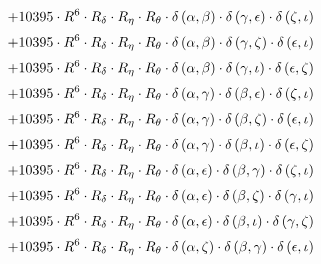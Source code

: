 \begin{subequations}
\begin{gather}
 \\[0.2em] \notag 		 + 10395 \cdot R^{6} \cdot R_{\delta{}} \cdot R_{\eta{}} \cdot R_{\theta{}} \cdot \delta{}\left(\alpha{}, \beta{}\right) \cdot \delta{}\left(\gamma{}, \epsilon{}\right) \cdot \delta{}\left(\zeta{}, \iota{}\right) 
 \\[0.2em] \notag 		 + 10395 \cdot R^{6} \cdot R_{\delta{}} \cdot R_{\eta{}} \cdot R_{\theta{}} \cdot \delta{}\left(\alpha{}, \beta{}\right) \cdot \delta{}\left(\gamma{}, \zeta{}\right) \cdot \delta{}\left(\epsilon{}, \iota{}\right) 
 \\[0.2em] \notag 		 + 10395 \cdot R^{6} \cdot R_{\delta{}} \cdot R_{\eta{}} \cdot R_{\theta{}} \cdot \delta{}\left(\alpha{}, \beta{}\right) \cdot \delta{}\left(\gamma{}, \iota{}\right) \cdot \delta{}\left(\epsilon{}, \zeta{}\right) 
 \\[0.2em] \notag 		 + 10395 \cdot R^{6} \cdot R_{\delta{}} \cdot R_{\eta{}} \cdot R_{\theta{}} \cdot \delta{}\left(\alpha{}, \gamma{}\right) \cdot \delta{}\left(\beta{}, \epsilon{}\right) \cdot \delta{}\left(\zeta{}, \iota{}\right) 
 \\[0.2em] \notag 		 + 10395 \cdot R^{6} \cdot R_{\delta{}} \cdot R_{\eta{}} \cdot R_{\theta{}} \cdot \delta{}\left(\alpha{}, \gamma{}\right) \cdot \delta{}\left(\beta{}, \zeta{}\right) \cdot \delta{}\left(\epsilon{}, \iota{}\right) 
 \\[0.2em] \notag 		 + 10395 \cdot R^{6} \cdot R_{\delta{}} \cdot R_{\eta{}} \cdot R_{\theta{}} \cdot \delta{}\left(\alpha{}, \gamma{}\right) \cdot \delta{}\left(\beta{}, \iota{}\right) \cdot \delta{}\left(\epsilon{}, \zeta{}\right) 
 \\[0.2em] \notag 		 + 10395 \cdot R^{6} \cdot R_{\delta{}} \cdot R_{\eta{}} \cdot R_{\theta{}} \cdot \delta{}\left(\alpha{}, \epsilon{}\right) \cdot \delta{}\left(\beta{}, \gamma{}\right) \cdot \delta{}\left(\zeta{}, \iota{}\right) 
 \\[0.2em] \notag 		 + 10395 \cdot R^{6} \cdot R_{\delta{}} \cdot R_{\eta{}} \cdot R_{\theta{}} \cdot \delta{}\left(\alpha{}, \epsilon{}\right) \cdot \delta{}\left(\beta{}, \zeta{}\right) \cdot \delta{}\left(\gamma{}, \iota{}\right) 
 \\[0.2em] \notag 		 + 10395 \cdot R^{6} \cdot R_{\delta{}} \cdot R_{\eta{}} \cdot R_{\theta{}} \cdot \delta{}\left(\alpha{}, \epsilon{}\right) \cdot \delta{}\left(\beta{}, \iota{}\right) \cdot \delta{}\left(\gamma{}, \zeta{}\right) 
 \\[0.2em] \notag 		 + 10395 \cdot R^{6} \cdot R_{\delta{}} \cdot R_{\eta{}} \cdot R_{\theta{}} \cdot \delta{}\left(\alpha{}, \zeta{}\right) \cdot \delta{}\left(\beta{}, \gamma{}\right) \cdot \delta{}\left(\epsilon{}, \iota{}\right) 

\end{gather}
\end{subequations}
